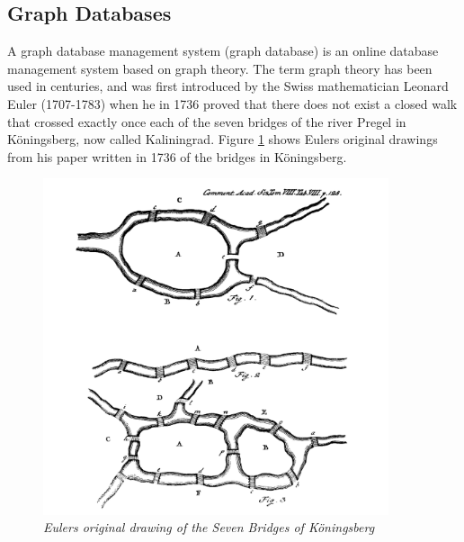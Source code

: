 \subsection{Graph Databases}
A graph database management system (graph database) \citep{robinson13} is an online database management system %
based on graph theory. The term graph theory has been used in centuries, and was first introduced by the Swiss mathematician Leonard Euler (1707-1783) when he in 1736 proved that there does not exist a closed walk that crossed exactly once each of the seven bridges of the river Pregel in Köningsberg, now called Kaliningrad\citep{alexanderson06}. Figure \ref{fig:7bridgesEuler} shows Eulers original drawings from his paper written in 1736 \citep{euler1741} of the bridges in Köningsberg. 

\begin{figure}[H]
  \centering
  \includegraphics[width=4in]{assets/7bridges-euler.png}
  \caption{\textit{Eulers original drawing of the Seven Bridges of Köningsberg}} 
  \label{fig:7bridgesEuler}
\end{figure}

